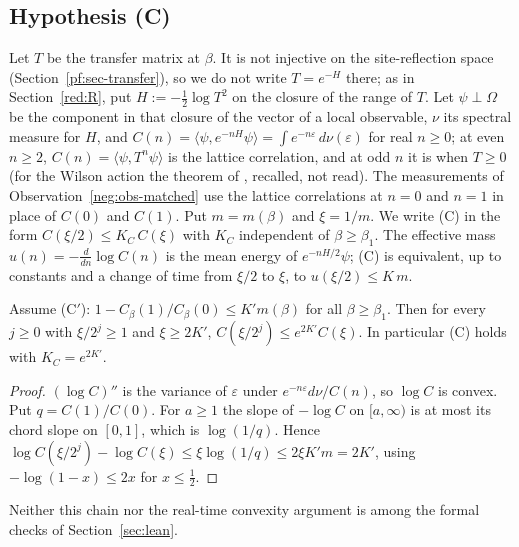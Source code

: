 \subsection{Hypothesis (C)}

Let $T$ be the transfer matrix at $\beta$. It is not injective on the site-reflection space
(Section~\ref{pf:sec-transfer}), so we do not write $T=e^{-H}$ there; as in
Section~\ref{red:R}, put $H:=-\frac12\log T^2$ on the closure of the range of $T$. Let $\psi\perp\Omega$ be
the component in that closure of the vector of a local observable, $\nu$ its spectral measure for $H$, and
$C(n)=\langle\psi,e^{-nH}\psi\rangle=\int e^{-n\varepsilon}\,d\nu(\varepsilon)$
for real $n\ge0$; at even $n\ge2$, $C(n)=\langle\psi,T^n\psi\rangle$ is the lattice correlation, and at odd $n$ it is when
$T\ge0$ (for the Wilson action the theorem of \cite{Lu77}, recalled, not read). The measurements of
Observation~\ref{neg:obs-matched} use the lattice correlations at $n=0$ and $n=1$ in place of $C(0)$ and $C(1)$. Put $m=m(\beta)$ and $\xi=1/m$. We write (C) in the form
$C(\xi/2)\le K_C\,C(\xi)$ with $K_C$ independent of $\beta\ge\beta_1$. The effective mass
$u(n)=-\frac{d}{dn}\log C(n)$ is the mean energy of $e^{-nH/2}\psi$; (C) is equivalent, up to
constants and a change of time from $\xi/2$ to $\xi$, to $u(\xi/2)\le K\,m$.

\begin{proposition}\label{neg:prop-Cprime}
Assume \textup{(C$'$)}: $1-C_\beta(1)/C_\beta(0)\le K'm(\beta)$ for all $\beta\ge\beta_1$. Then for
every $j\ge0$ with $\xi/2^j\ge1$ and $\xi\ge2K'$,
$C(\xi/2^j)\le e^{2K'}C(\xi)$. In particular (C) holds with $K_C=e^{2K'}$.
\end{proposition}

\begin{proof}
$(\log C)''$ is the variance of $\varepsilon$ under $e^{-n\varepsilon}d\nu/C(n)$, so $\log C$ is
convex. Put $q=C(1)/C(0)$. For $a\ge1$ the slope of $-\log C$ on $[a,\infty)$ is at most its
chord slope on $[0,1]$, which is $\log(1/q)$. Hence
$\log C(\xi/2^j)-\log C(\xi)\le\xi\log(1/q)\le2\xi K'm=2K'$, using $-\log(1-x)\le2x$ for
$x\le\frac12$.
\end{proof}

Neither this chain nor the real-time convexity argument is among the formal checks of Section~\ref{sec:lean}.

